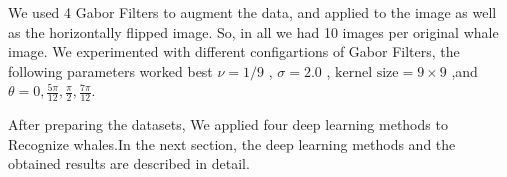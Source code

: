 We used 4 Gabor Filters to augment the data, and applied to the image as well as the horizontally flipped image. So, in all we had 10 images per original whale image. We experimented with different configartions of Gabor Filters, the following parameters worked best $\nu = 1/9$ , $\sigma = 2.0$ , $\text{kernel size} = 9 \times 9$ ,and $\theta = 0, \frac{5\pi}{12}, \frac{\pi}{2}, \frac{7\pi}{12}$.

After preparing the datasets, We applied four deep learning methods to Recognize whales.In the next section, the deep learning methods and the obtained results are described in detail.
